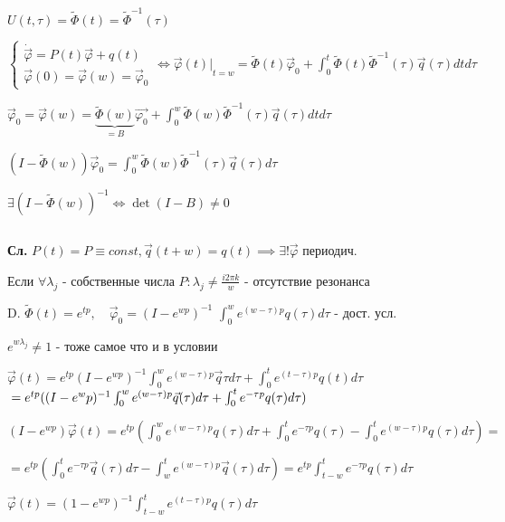 \documentclass[12pt, a4paper]{article}
\begin{document}
    $U(t, \tau) = \widetilde{\Phi}(t) = \widetilde{\Phi}^{-1}(\tau)$

    $\begin{cases}
        \dot{\vec{\varphi}} = P(t)\vec{\varphi} + q(t) \\
        \vec{\varphi}(0) = \vec{\varphi}(w) = \vec{\varphi}_0
    \end{cases} \iff \vec{\varphi}(t) |\underset{ t=w}{ } = 
    \widetilde{\Phi}(t)\vec{\varphi}_0 + \int^t_0\widetilde{\Phi}(t)\widetilde{\Phi}^{-1}(\tau)\vec{q}(\tau)dtd\tau$

    $\vec\varphi_0 = \vec{\varphi}(w) = \underbrace{\widetilde{\Phi}(w)}_{=B}\vec{\varphi_0} +
    \int^w_0\widetilde{\Phi}(w)\widetilde{\Phi}^{-1}(\tau)\vec{q}(\tau)dtd\tau$

    $(I - \widetilde{\Phi}(w))\vec{\varphi}_0 = \int^w_0 \widetilde{\Phi}(w)\widetilde{\Phi}^{-1}(\tau)\vec{q}(\tau)d\tau$

    \textit{$\exists(I - \widetilde{\Phi}(w))^{-1} \iff \det(I-B)\neq 0$} %

    \par $ $

    \textbf{Сл.} $P(t) = P \equiv const, \vec{q}(t+w) = q(t) \implies \exists!\vec{\varphi}$ периодич.

    Если $\forall \lambda_j$ - собственные числа $P: \lambda_j \neq \frac{i2\pi k}{w}$ - отсутствие резонанса

    D. $\widetilde{\Phi}(t) = e^{tp}, \quad \vec{\varphi}_0 = (I - e^{wp})^{-1}$
    $\int^w_0 e^{(w-\tau)p}q(\tau)d\tau$ - дост. усл.

    $e^{w\lambda_j}\neq 1$ - тоже самое что и в условии

    $\vec{\varphi}(t) = e^{tp}(I - e^{wp})^{-1}\int^w_0 e^{(w-\tau)p}\vec{q}\tau d\tau + \int^t_0 e^{(t-\tau)p}q(t)d\tau$
    $\\= e^{tp}( (I - e^wp)^{-1} \int^w_0 e^{(w-\tau)p}\vec{q}(\tau)d\tau + \int^t_0 e^{-\tau p}q(\tau)d\tau )$

    $(I - e^{wp})\vec{\varphi}(t) = e^{tp}(\int^w_0 e^{(w-\tau)p}q(\tau)d\tau + \int^t_0 e^{-\tau p}q(\tau) - \int^t_0 e^{(w-\tau)p}q(\tau)d\tau) =$

    $= e^{tp}(\int_0^t e^{-\tau p}\vec{q}(\tau)d\tau - \int^t_w e^{(w-\tau)p}\vec{q}(\tau)d\tau ) = e^{tp} \int^t_{t-w} e^{-\tau p}q(\tau)d\tau$%

    $\boxed{\vec\varphi(t) = (1 - e^{wp})^{-1}\int^t_{t-w} e^{(t-\tau)p}q(\tau)d\tau}$
\end{document}

